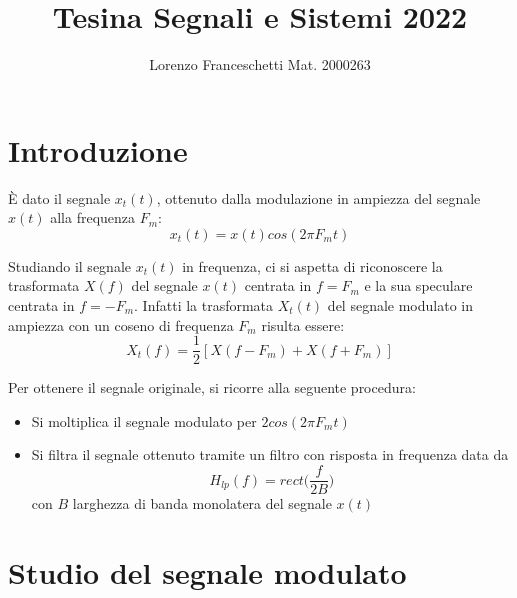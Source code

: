 \documentclass[12pt]{article}
\title{Tesina Segnali e Sistemi 2022}
\author{Lorenzo Franceschetti Mat. 2000263}
\date{}
\begin{document}
\maketitle

\section{Introduzione}

È dato il segnale $x_{t}(t)$, ottenuto dalla modulazione in ampiezza del segnale $x(t)$ alla frequenza $F_{m}$: 
\begin{equation}
	x_{t}(t) = x(t) cos(2\pi F_{m}t)
\end{equation} 

Studiando il segnale $x_{t}(t)$ in frequenza, ci si aspetta di riconoscere la trasformata $X(f)$ del segnale $x(t)$ centrata in $f = F_{m}$ e la sua speculare centrata in $f = -F_{m}$. Infatti la trasformata $X_{t}(t)$ del segnale modulato in ampiezza con un coseno di frequenza $F_{m}$ risulta essere:
\begin{equation}
	X_{t}(f) = \frac{1}{2}[X(f - F_{m}) + X(f + F_{m})]
\end{equation}

Per ottenere il segnale originale, si ricorre alla seguente procedura:
\begin{itemize}
	\item Si moltiplica il segnale modulato per $2cos(2\pi F_{m}t)$
	\item Si filtra il segnale ottenuto tramite un filtro con risposta in frequenza data da
	\begin{equation}
		H_{lp}(f) = rect \biggl(\frac{f}{2B}\biggr)
	\end{equation}
	con $B$ larghezza di banda monolatera del segnale $x(t)$
\end{itemize}

\section{Studio del segnale modulato}
\end{document}
